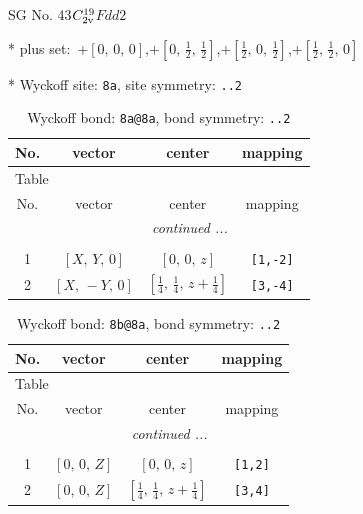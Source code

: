 \documentclass[fleqn,8pt]{jsarticle}
\begin{document}
\setcounter{MaxMatrixCols}{32}

\renewcommand{\tablename}{Table~}
\renewcommand{\figurename}{Figure~}
\begin{center}
\LARGE
SG No. 43\quad$C_{\rm 2v}^{19}$\quad$Fdd2$\quad[ orthorhombic ]
\end{center}

* plus set:\,\,\,$+\left[ 0,\, 0,\, 0 \right]$,\quad $+\left[ 0,\, \frac{1}{2},\, \frac{1}{2} \right]$,\quad $+\left[ \frac{1}{2},\, 0,\, \frac{1}{2} \right]$,\quad $+\left[ \frac{1}{2},\, \frac{1}{2},\, 0 \right]$


* Wyckoff site: {\tt 8a}, site symmetry: {\tt ..2}
\renewcommand{\arraystretch}{1.2}
\begin{longtable}{cccc}
\caption{Wyckoff bond: {\tt 8a@8a}, bond symmetry: {\tt ..2}}
 \\
 \hline \hline
No. & vector & center & mapping \\ \hline \endfirsthead

\multicolumn{3}{l}{\tablename\ \thetable{}} \\
 \hline \hline
No. & vector & center & mapping \\ \hline \endhead

 \hline \hline
\multicolumn{3}{r}{\footnotesize\it continued ...} \\ \endfoot

 \hline \hline
\multicolumn{3}{r}{} \\ \endlastfoot

1 & $\left[ X,\, Y,\, 0 \right]$ & $\left[ 0,\, 0,\, z \right]$ & {\tt [1,-2]} \\ \hline
2 & $\left[ X,\, - Y,\, 0 \right]$ & $\left[ \frac{1}{4},\, \frac{1}{4},\, z + \frac{1}{4} \right]$ & {\tt [3,-4]} \\
\end{longtable}
\renewcommand{\arraystretch}{1.2}
\begin{longtable}{cccc}
\caption{Wyckoff bond: {\tt 8b@8a}, bond symmetry: {\tt ..2}}
 \\
 \hline \hline
No. & vector & center & mapping \\ \hline \endfirsthead

\multicolumn{3}{l}{\tablename\ \thetable{}} \\
 \hline \hline
No. & vector & center & mapping \\ \hline \endhead

 \hline \hline
\multicolumn{3}{r}{\footnotesize\it continued ...} \\ \endfoot

 \hline \hline
\multicolumn{3}{r}{} \\ \endlastfoot

1 & $\left[ 0,\, 0,\, Z \right]$ & $\left[ 0,\, 0,\, z \right]$ & {\tt [1,2]} \\ \hline
2 & $\left[ 0,\, 0,\, Z \right]$ & $\left[ \frac{1}{4},\, \frac{1}{4},\, z + \frac{1}{4} \right]$ & {\tt [3,4]} \\
\end{longtable}
\end{document}
